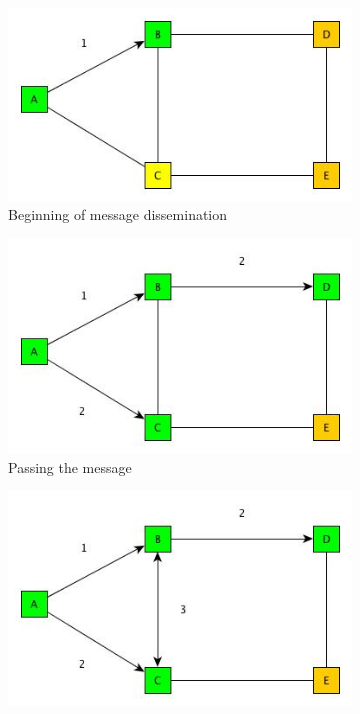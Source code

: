 \begin{figure}[h!]
   \begin{subfigure}[t]{0.45\textwidth}
      \vspace{0pt}
      \includegraphics[width=\linewidth]{figures/network_gossip_1.jpg}
      \caption{Beginning of message dissemination}
   \end{subfigure}
   \hfill
   \begin{subfigure}[t]{0.45\textwidth}
      \vspace{0pt}
      \includegraphics[width=\linewidth]{figures/network_gossip_2.jpg}
      \caption{Passing the message}
   \end{subfigure}
   \vspace{2ex}
     \begin{center}
     \begin{subfigure}[c]{0.45\textwidth}
      \vspace{0pt}
      \includegraphics[width=\linewidth]{figures/network_gossip_3.jpg}

\end{subfigure}
\end{center}
\end{figure}
